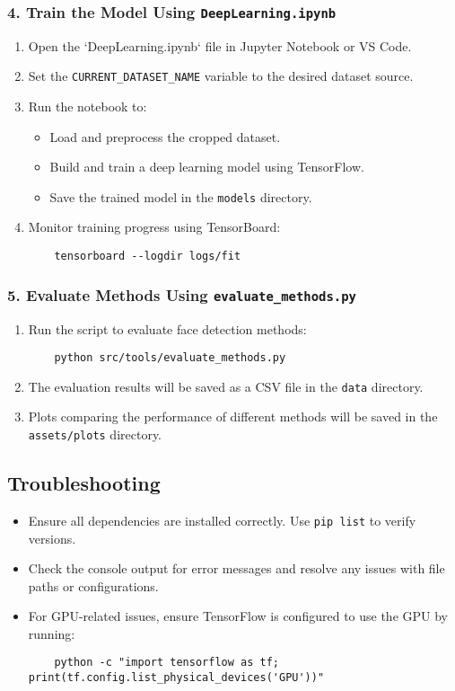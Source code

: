 \documentclass[a4paper]{feidippp}
\begin{document}
\subsubsection{4. Train the Model Using \texttt{DeepLearning.ipynb}}
\begin{enumerate}
    \item Open the `DeepLearning.ipynb` file in Jupyter Notebook or VS Code.
    \item Set the \texttt{CURRENT\_DATASET\_NAME} variable to the desired dataset source.
    \item Run the notebook to:
    \begin{itemize}
        \item Load and preprocess the cropped dataset.
        \item Build and train a deep learning model using TensorFlow.
        \item Save the trained model in the \texttt{models} directory.
    \end{itemize}
    \item Monitor training progress using TensorBoard:
    \begin{verbatim}
    tensorboard --logdir logs/fit
    \end{verbatim}
\end{enumerate}

\subsubsection{5. Evaluate Methods Using \texttt{evaluate\_methods.py}}
\begin{enumerate}
    \item Run the script to evaluate face detection methods:
    \begin{verbatim}
    python src/tools/evaluate_methods.py
    \end{verbatim}
    \item The evaluation results will be saved as a CSV file in the \texttt{data} directory.
    \item Plots comparing the performance of different methods will be saved in the \texttt{assets/plots} directory.
\end{enumerate}

\subsection{Troubleshooting}

\begin{itemize}
    \item Ensure all dependencies are installed correctly. Use \texttt{pip list} to verify versions.
    \item Check the console output for error messages and resolve any issues with file paths or configurations.
    \item For GPU-related issues, ensure TensorFlow is configured to use the GPU by running:
    \begin{verbatim}
    python -c "import tensorflow as tf; print(tf.config.list_physical_devices('GPU'))"
    \end{verbatim}
\end{itemize}
\end{document}
